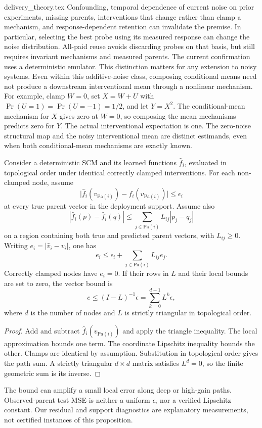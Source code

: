 \begin{filecontents*}[overwrite]{delivery_theory.tex}
Confounding, temporal dependence of current noise on prior experiments,
missing parents, interventions that change rather than clamp a
mechanism, and response-dependent retention can invalidate the premise. In
particular, selecting the best probe using its measured response can change
the noise distribution. All-paid reuse avoids discarding probes on that basis,
but still requires invariant mechanisms and measured parents. The current
confirmation uses a deterministic emulator. This distinction matters for
any extension to noisy systems. Even within this additive-noise class,
composing conditional means need not produce a
downstream interventional mean through a nonlinear mechanism.
For example, clamp $W=0$, set $X=W+U$ with
$\Pr(U=1)=\Pr(U=-1)=1/2$, and let $Y=X^2$. The conditional-mean mechanism
for $X$ gives zero at $W=0$, so composing the mean mechanisms predicts zero
for $Y$. The actual interventional expectation is one. The zero-noise
structural map and the noisy interventional mean are distinct estimands,
even when both conditional-mean mechanisms are exactly known.

\begin{proposition}
Consider a deterministic SCM and its learned functions $\hat f_i$, evaluated
in topological order under identical correctly clamped interventions.
For each non-clamped node, assume
\[
 \bigl|\hat f_i(v_{\mathrm{Pa}(i)})-f_i(v_{\mathrm{Pa}(i)})\bigr|
 \leq\epsilon_i
\]
at every true parent vector in the deployment support. Assume also
\[
 |\hat f_i(p)-\hat f_i(q)|\leq
 \sum_{j\in\mathrm{Pa}(i)}L_{ij}|p_j-q_j|
\]
on a region containing both true and predicted parent vectors, with
$L_{ij}\geq0$. Writing $e_i=|\hat v_i-v_i|$, one has
\[
 e_i\leq\epsilon_i+\sum_{j\in\mathrm{Pa}(i)}L_{ij}e_j.
\]
Correctly clamped nodes have $e_i=0$. If their rows in $L$ and their local
bounds are set to zero, the vector bound is
\[
 e\leq(I-L)^{-1}\epsilon=\sum_{k=0}^{d-1}L^k\epsilon,
\]
where $d$ is the number of nodes and $L$ is strictly triangular in topological
order.
\end{proposition}
\begin{proof}
Add and subtract $\hat f_i(v_{\mathrm{Pa}(i)})$ and apply the triangle
inequality. The local approximation bounds one term. The coordinate Lipschitz
inequality bounds the other. Clamps are identical by assumption. Substitution
in topological order gives the path sum. A strictly triangular $d\times d$
matrix satisfies $L^d=0$, so the finite geometric sum is its inverse.
\end{proof}
The bound can amplify a small local error along deep or high-gain paths.
Observed-parent test MSE is neither a uniform $\epsilon_i$ nor a verified
Lipschitz constant. Our residual and support diagnostics are explanatory
measurements, not certified instances of this proposition.


\end{filecontents*}
